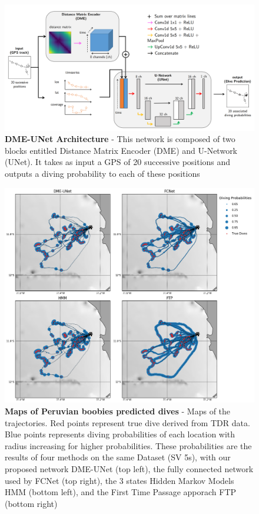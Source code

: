 \documentclass{article}
\begin{document}
\begin{figure}[h]
  \hspace*{-2cm}
  \includegraphics[scale=0.45]{figure3.png}
  \caption{\textbf{DME-UNet Architecture} - This network is composed of two blocks entitled Distance Matrix Encoder (DME) and U-Network (UNet). It takes as input a GPS of 20 successive positions and outputs a diving probability to each of these positions}
  \label{figure3}
\end{figure}

\begin{figure}[h]
  \centering
  \includegraphics[scale=0.5]{figure4a.png}
  \caption{\textbf{Maps of Peruvian boobies predicted dives} - Maps of the trajectories. Red points represent true dive derived from TDR data. Blue points represents diving probabilities of each location with radius increasing for higher probabilities. These probabilities are the results of four methods on the same Dataset (SV 5s), with our proposed network DME-UNet (top left), the fully connected network used by \cite{browning_predicting_2018}  FCNet (top right), the 3 states Hidden Markov Models HMM (bottom left), and the First Time Passage apporach FTP (bottom right)}
  \label{figure4a}
\end{figure}
\end{document}
